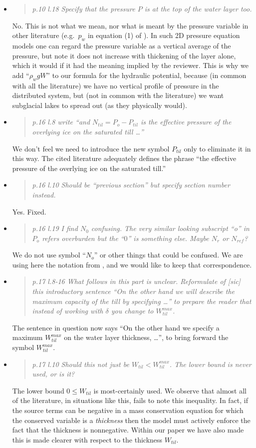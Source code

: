 \documentclass[11pt,reqno]{amsart}
\newcommand{\reply}[2]{
\medskip\medskip
\item  \begin{quote}
\emph{#1}
\end{quote}

\medskip
\noindent #2}
\begin{document}
\begin{itemize}
\reply{p.10 l.18 Specify that the pressure $P$ is at the top of the water layer too.}
{No.  This is not what we mean, nor what is meant by the pressure variable in other literature (e.g.~$p_w$ in equation (1) of \cite{Werderetal2013}).  In such 2D pressure equation models one can regard the pressure variable as a vertical average of the pressure, but note it does not increase with thickening of the layer alone, which it would if it had the meaning implied by the reviewer.  This is why we add ``$\rho_w g W$'' to our formula for the hydraulic potential, because (in common with all the literature) we have no vertical profile of pressure in the distributed system, but (not in common with the literature) we want subglacial lakes to spread out (as they physically would).}

\reply{p.16 l.8 write ``and $N_{til} = P_o-P_{til}$ is the effective pressure of the overlying ice on the saturated till \dots''}
{We don't feel we need to introduce the new symbol $P_{til}$ only to eliminate it in this way.  The cited literature adequately defines the phrase ``the effective pressure of the overlying ice on the saturated till.''}

\reply{p.16 l.10 Should be ``previous section'' but specify section number instead.}
{Yes.  Fixed.}

\reply{p.16 l.19 I find $N_0$ confusing. The very similar looking subscript ``o'' in $P_o$ refers overburden but the ``$0$'' is something else. Maybe $N_r$ or $N_{ref}$?}
{We do not use symbol ``$N_o$'' or other things that could be confused.  We are using here the notation from \cite{Tulaczyketal2000}, and we would like to keep that correspondence.}

\reply{p.17 l.8-16 What follows in this part is unclear. Reformulate of [sic] this introductory sentence ``On the other hand we will describe the maximum capacity of the till by specifying \dots'' to prepare the reader that instead of working with $\delta$ you change to $W_{til}^{max}$.}
{The sentence in question now says ``On the other hand we specify a maximum $W_{til}^{max}$ on the water layer thickness, \dots'', to bring forward the symbol $W_{til}^{max}$.}

\reply{p.17 l.10 Should this not just be $W_{til} < W_{til}^{max}$.  The lower bound is never used, or is it?}
{The lower bound $0\le W_{til}$ is most-certainly used.  We observe that almost all of the literature, in situations like this, fails to note this inequality.  In fact, if the source terms can be negative in a mass conservation equation for which the conserved variable is a \emph{thickness} then the model must actively enforce the fact that the thickness is nonnegative.  Within our paper we have also made this is made clearer with respect to the thickness $W_{til}$.}


\end{itemize}
\end{document}
